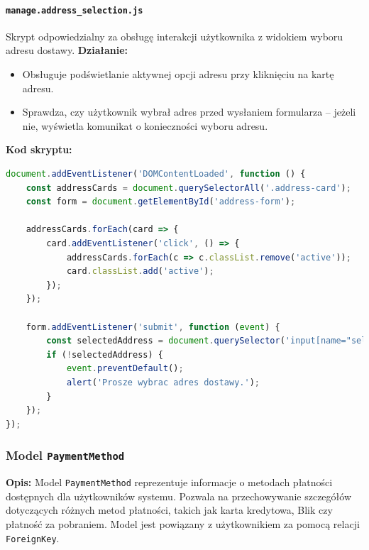 \documentclass[12pt,a4paper,oneside]{article}
\theoremstyle{definition}
\numberwithin{equation}{section}
\begin{document}
\paragraph{\texttt{manage.address\_selection.js}}
Skrypt odpowiedzialny za obsługę interakcji użytkownika z widokiem wyboru adresu dostawy.  
\textbf{Działanie:}
\begin{itemize}
    \item Obsługuje podświetlanie aktywnej opcji adresu przy kliknięciu na kartę adresu.
    \item Sprawdza, czy użytkownik wybrał adres przed wysłaniem formularza – jeżeli nie, wyświetla komunikat o konieczności wyboru adresu.
\end{itemize}

\textbf{Kod skryptu:}
\begin{lstlisting}[language=JavaScript, caption=Skrypt manage.address\_choice.js]
document.addEventListener('DOMContentLoaded', function () {
    const addressCards = document.querySelectorAll('.address-card');
    const form = document.getElementById('address-form');

    addressCards.forEach(card => {
        card.addEventListener('click', () => {
            addressCards.forEach(c => c.classList.remove('active'));
            card.classList.add('active');
        });
    });

    form.addEventListener('submit', function (event) {
        const selectedAddress = document.querySelector('input[name="selected_address"]:checked');
        if (!selectedAddress) {
            event.preventDefault();
            alert('Prosze wybrac adres dostawy.');
        }
    });
});
\end{lstlisting}


% 
% 
\subsubsection{Model \texttt{PaymentMethod}}

\textbf{Opis:}  
Model \texttt{PaymentMethod} reprezentuje informacje o metodach płatności dostępnych dla użytkowników systemu. Pozwala na przechowywanie szczegółów dotyczących różnych metod płatności, takich jak karta kredytowa, Blik czy płatność za pobraniem. Model jest powiązany z użytkownikiem za pomocą relacji \texttt{ForeignKey}.
\end{document}
